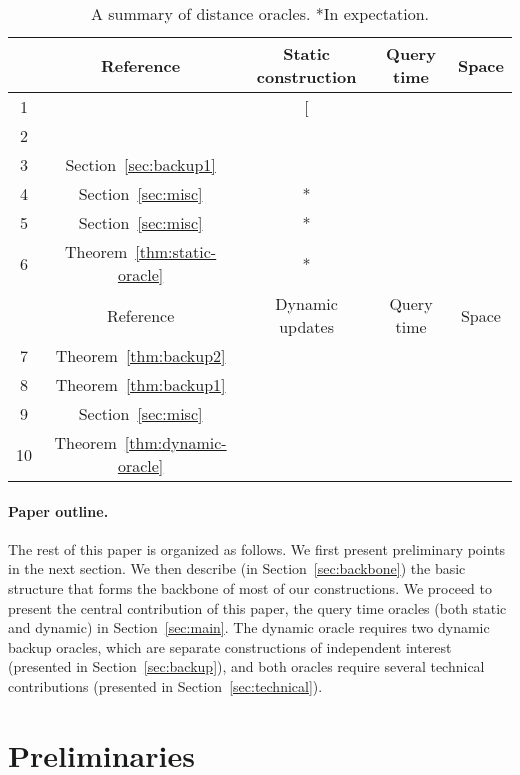 \documentclass[11pt]{article}
\begin{document}
\renewcommand{\arraystretch}{1.2}
\begin{table}
\small
\centering
\begin{tabular}{||c|c|c|c|c||}
\hline
 & Reference & Static construction & Query time & Space  \\
\hline\hline 
1& \cite{HaPe06} & [ &  
&  \\
\hline
2& \cite{HaPe06} &  &  &  \\
\hline
3& Section~\ref{sec:backup1} &  & 
 &  \\
\hline
4& Section~\ref{sec:misc} & * & 
 &  \\
\hline
5& Section~\ref{sec:misc} & * &  &  \\
\hline
6& Theorem~\ref{thm:static-oracle} & * &  &  \\
\hline\hline
 & Reference & Dynamic updates & Query time & Space  \\
\hline\hline 
7& Theorem~\ref{thm:backup2} &  & 
 &  \\
\hline
8& Theorem~\ref{thm:backup1} &  &  &  \\
\hline
9& Section~\ref{sec:misc} &  &  & 
 \\
\hline
10& Theorem~\ref{thm:dynamic-oracle} &  &  &  \\
\hline
\end{tabular}
\caption{A summary of  distance oracles. *In expectation.}\label{tab:misc}
\end{table}
\normalsize


\vspace{-10pt}
\paragraph{Paper outline.}
The rest of this paper is organized as follows. We first present preliminary points
in the next section. We then describe (in Section~\ref{sec:backbone}) the basic 
structure that forms the backbone of most of our constructions. We proceed to present 
the central contribution of this paper, the  query time oracles 
(both static and dynamic) in Section~\ref{sec:main}. The dynamic oracle requires two 
dynamic backup oracles, which are separate constructions of independent interest
(presented in Section~\ref{sec:backup}), and both oracles require several technical 
contributions (presented in Section~\ref{sec:technical}).


\section{Preliminaries}\label{sec:prelim}
\end{document}
